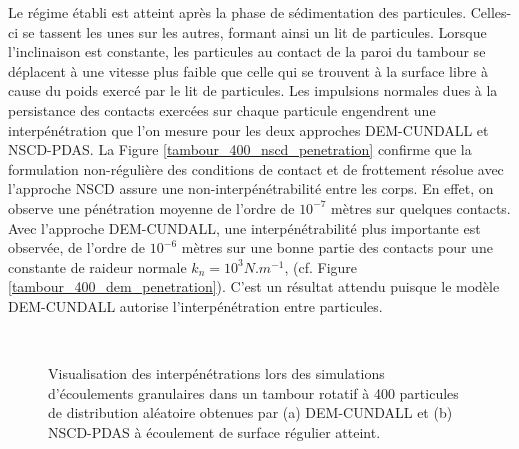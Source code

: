 Le régime établi est atteint après la phase de sédimentation des particules. Celles-ci se tassent les unes sur les autres, formant ainsi un lit de particules. Lorsque l'inclinaison est constante, les particules au contact de la paroi du tambour se déplacent à une vitesse plus faible que celle qui se trouvent à la surface libre à cause du poids exercé par le lit de particules. Les impulsions normales dues à la persistance des contacts exercées sur chaque particule engendrent une interpénétration que l'on mesure pour les deux approches  DEM-CUNDALL et NSCD-PDAS. La Figure \ref{tambour_400_nscd_penetration} confirme que la formulation non-régulière des conditions de contact et de frottement résolue avec l'approche NSCD assure une non-interpénétrabilité entre les corps. En effet, on observe une pénétration moyenne de l'ordre de $10^{-7}$ mètres sur quelques contacts. Avec l'approche DEM-CUNDALL, une interpénétrabilité plus importante est observée, de l'ordre de $10^{-6}$ mètres sur une bonne partie des contacts pour une constante de raideur normale $k_n = 10^3 N.m^{-1}$, (cf. Figure \ref{tambour_400_dem_penetration}). C'est un résultat attendu puisque le modèle DEM-CUNDALL autorise l'interpénétration entre particules.

\begin{figure}[h!]
\hspace{\fill}
   \\
\caption{\label{tambour_400_penetration}Visualisation des interpénétrations lors des simulations d'écoulements granulaires dans un tambour rotatif à 400 particules de distribution aléatoire obtenues par (a) DEM-CUNDALL et (b) NSCD-PDAS à écoulement de surface régulier atteint.}
\end{figure}

